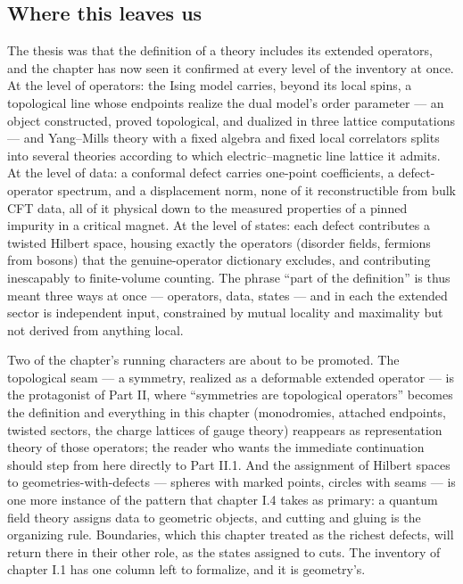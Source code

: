 \subsection{Where this leaves us}
\label{sec:ch3-closing}

The thesis was that the definition of a theory includes its extended
operators, and the chapter has now seen it confirmed at every level of
the inventory at once. At the level of operators: the Ising model
carries, beyond its local spins, a topological line whose endpoints
realize the dual model's order parameter --- an object constructed,
proved topological, and dualized in three lattice computations --- and
Yang--Mills theory with a fixed algebra and fixed local correlators
splits into several theories according to which electric--magnetic
line lattice it admits. At the level of data: a conformal defect
carries one-point coefficients, a defect-operator spectrum, and a
displacement norm, none of it reconstructible from bulk CFT data, all
of it physical down to the measured properties of a pinned impurity in
a critical magnet. At the level of states: each defect contributes a
twisted Hilbert space, housing exactly the operators (disorder fields,
fermions from bosons) that the genuine-operator dictionary excludes,
and contributing inescapably to finite-volume counting. The phrase
``part of the definition'' is thus meant three ways at once ---
operators, data, states --- and in each the extended sector is
independent input, constrained by mutual locality and maximality but
not derived from anything local.

Two of the chapter's running characters are about to be promoted. The
topological seam --- a symmetry, realized as a deformable extended
operator --- is the protagonist of Part II, where ``symmetries are
topological operators'' becomes the definition and everything in this
chapter (monodromies, attached endpoints, twisted sectors, the
charge lattices of gauge theory) reappears as representation theory of
those operators; the reader who wants the immediate continuation
should step from here directly to Part II.1. And the assignment of
Hilbert spaces to geometries-with-defects --- spheres with marked
points, circles with seams --- is one more instance of the pattern
that chapter I.4 takes as primary: a quantum field theory assigns data
to geometric objects, and cutting and gluing is the organizing rule.
Boundaries, which this chapter treated as the richest defects, will
return there in their other role, as the states assigned to cuts. The
inventory of chapter I.1 has one column left to formalize, and it is
geometry's.

